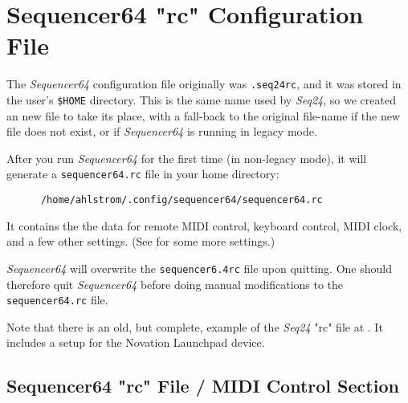 %
%
%

\section{Sequencer64 "rc" Configuration File}
\label{sec:seq64_rc_file}

   \index{[sequencer64.rc]}   %
   The \textsl{Sequencer64} configuration file originally was \texttt{.seq24rc},
   and it was stored in the user's \texttt{\$HOME} directory.
   This is the same name used by \textsl{Seq24}, so we created an new file
   to take its place, with a fall-back to the original file-name if the new
   file does not exist, or if \textsl{Sequencer64} is running in
   legacy mode.

   After you run \textsl{Sequencer64} for the first time (in non-legacy
   mode), it will generate a \texttt{sequencer64.rc} file in your home
   directory:

   \begin{verbatim}
      /home/ahlstrom/.config/sequencer64/sequencer64.rc
   \end{verbatim}

   It contains the the data for remote MIDI control, keyboard
   control, MIDI clock, and a few other settings.
   (See  for some more settings.)

   \textsl{Sequencer64} will overwrite the \texttt{sequencer6.4rc} file upon
   quitting.  One should therefore quit \textsl{Sequencer64} before doing
   manual modifications to the \texttt{sequencer64.rc} file.

   Note that there is an old, but complete, example of the \textsl{Seq24}
   "rc" file at \cite{seq24launchpadmapper}.  It includes a setup for the
   Novation Launchpad device.

\subsection{Sequencer64 "rc" File / MIDI Control Section}
\label{subsec:seq64_rc_file_midi_control}

